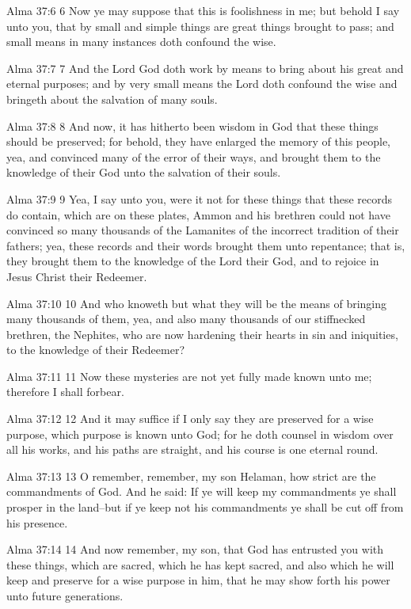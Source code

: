 Alma 37:6
 6 Now ye may suppose that this is foolishness in me; but behold
I say unto you, that by small and simple things are great things
brought to pass; and small means in many instances doth confound
the wise.

Alma 37:7
 7 And the Lord God doth work by means to bring about his great
and eternal purposes; and by very small means the Lord doth
confound the wise and bringeth about the salvation of many souls.

Alma 37:8
 8 And now, it has hitherto been wisdom in God that these things
should be preserved; for behold, they have enlarged the memory of
this people, yea, and convinced many of the error of their ways,
and brought them to the knowledge of their God unto the salvation
of their souls.

Alma 37:9
 9 Yea, I say unto you, were it not for these things that these
records do contain, which are on these plates, Ammon and his
brethren could not have convinced so many thousands of the
Lamanites of the incorrect tradition of their fathers; yea, these
records and their words brought them unto repentance; that is,
they brought them to the knowledge of the Lord their God, and to
rejoice in Jesus Christ their Redeemer.

Alma 37:10
 10 And who knoweth but what they will be the means of bringing
many thousands of them, yea, and also many thousands of our
stiffnecked brethren, the Nephites, who are now hardening their
hearts in sin and iniquities, to the knowledge of their Redeemer?

Alma 37:11
 11 Now these mysteries are not yet fully made known unto me;
therefore I shall forbear.

Alma 37:12
 12 And it may suffice if I only say they are preserved for a
wise purpose, which purpose is known unto God; for he doth
counsel in wisdom over all his works, and his paths are straight,
and his course is one eternal round.

Alma 37:13
 13 O remember, remember, my son Helaman, how strict are the
commandments of God. And he said: If ye will keep my
commandments ye shall prosper in the land--but if ye keep not his
commandments ye shall be cut off from his presence.

Alma 37:14
 14 And now remember, my son, that God has entrusted you with
these things, which are sacred, which he has kept sacred, and
also which he will keep and preserve for a wise purpose in him,
that he may show forth his power unto future generations.

